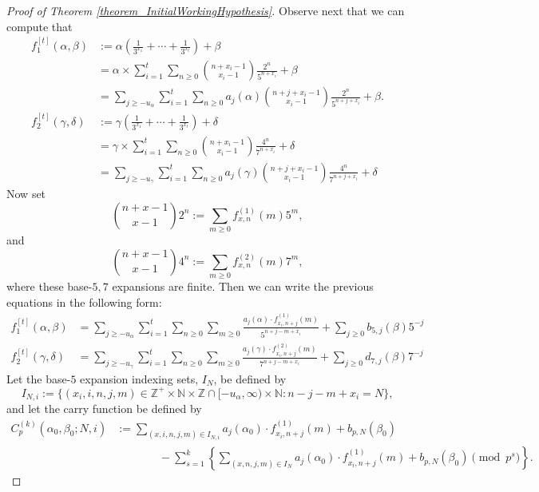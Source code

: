 \documentclass[12pt]{article}
\begin{document}
\begin{proof}[Proof of Theorem \ref{theorem_InitialWorkingHypothesis}]
Observe next that we can compute that 
\begin{align*} 
f_1^{[t]}(\alpha,\beta) & := \alpha\left(\frac{1}{3^{x_1}}+\cdots+\frac{1}{3^{x_t}}\right) + \beta \\ 
     & = \alpha \times \sum_{i=1}^t \sum_{n \geq 0} \binom{n+x_i-1}{x_i-1} \frac{2^n}{5^{n+x_i}} + \beta \\ 
     & = 
      \sum_{j \geq -u_{\alpha}} \sum_{i=1}^t \sum_{n \geq 0} a_j(\alpha) 
      \binom{n+j+x_i-1}{x_i-1} \frac{2^n}{5^{n+j+x_i}} + \beta. \\ 
f_2^{[t]}(\gamma,\delta) & := \gamma\left(\frac{1}{3^{x_1}}+\cdots+\frac{1}{3^{x_t}}\right) + \delta \\ 
     & = \gamma \times \sum_{i=1}^t \sum_{n \geq 0} \binom{n+x_i-1}{x_i-1} \frac{4^n}{7^{n+x_i}} + \delta \\ 
     & = 
      \sum_{j \geq -u_{\gamma}} \sum_{i=1}^t \sum_{n \geq 0} a_j(\gamma) 
      \binom{n+j+x_i-1}{x_i-1} \frac{4^n}{7^{n+j+x_i}} + \delta
\end{align*} 
Now set $$\binom{n+x-1}{x-1} 2^n := \sum_{m \geq 0} f_{x,n}^{(1)}(m) 5^m,$$ and 
$$\binom{n+x-1}{x-1} 4^n := \sum_{m \geq 0} f_{x,n}^{(2)}(m) 7^m,$$
where these base-$5,7$ expansions 
are finite. Then we can write the previous equations in the following form: 
\begin{align*} 
f_1^{[t]}(\alpha,\beta) & = 
      \sum_{j \geq -u_{\alpha}} \sum_{i=1}^t \sum_{n \geq 0} \sum_{m \geq 0} 
      \frac{a_j(\alpha) \cdot f_{x_i,n+j}^{(1)}(m)}{5^{n+j-m+x_i}} + 
      \sum_{j \geq 0} b_{5,j}(\beta) 5^{-j} \\ 
f_2^{[t]}(\gamma,\delta) & = 
      \sum_{j \geq -u_{\gamma}} \sum_{i=1}^t \sum_{n \geq 0} \sum_{m \geq 0} 
      \frac{a_j(\gamma) \cdot f_{x_i,n+j}^{(2)}(m)}{7^{n+j-m+x_i}} + 
      \sum_{j \geq 0} d_{7,j}(\beta) 7^{-j} 
\end{align*} 
Let the base-$5$ expansion indexing sets, $I_N$, be defined by 
\[
I_{N,i} := \{(x_i,i,n,j,m) \in \mathbb{Z}^+ \times \mathbb{N} \times 
     \mathbb{Z} \cap [-u_{\alpha}, \infty) \times 
     \mathbb{N}: n-j-m+x_i = N\}, 
\] 
and let the carry function be defined by 
\begin{align*} 
C_p^{(k)}(\alpha_0,\beta_0; N, i) & := \sum_{(x,i,n,j,m) \in I_{N,i}} a_j(\alpha_0) \cdot 
     f_{x_i,n+j}^{(1)}(m)+b_{p,N}(\beta_0) \\ 
     & \phantom{:=\qquad\ } - 
     \sum_{s=1}^k \left\{\sum_{(x,n,j,m) \in I_N} a_j(\alpha_0) \cdot f_{x_i,n+j}^{(1)}(m)+b_{p,N}(\beta_0) 
     \pmod{p^s}\right\}. 

\end{align*}
\end{proof}
\end{document}
